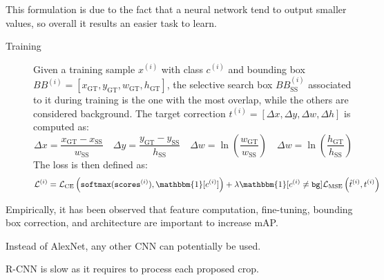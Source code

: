 \begin{description}
\begin{description}
                \begin{remark}
                    This formulation is due to the fact that a neural network tend to output smaller values, so overall it results an easier task to learn.
                \end{remark}

                \begin{description}
                    \item[Training] 
                    Given a training sample $x^{(i)}$ with class $c^{(i)}$ and bounding box $BB^{(i)} = [x_\text{GT}, y_\text{GT}, w_\text{GT}, h_\text{GT}]$, the selective search box $BB_\text{SS}^{(i)}$ associated to it during training is the one with the most overlap, while the others are considered background. The target correction $t^{(i)} = [\Delta x, \Delta y, \Delta w, \Delta h]$ is computed as:
                    \[ 
                        \Delta x = \frac{x_\text{GT} - x_\text{SS}}{w_\text{SS}}
                        \quad
                        \Delta y = \frac{y_\text{GT} - y_\text{SS}}{h_\text{SS}}
                        \quad
                        \Delta w = \ln\left(\frac{w_\text{GT}}{w_\text{SS}} \right)
                        \quad
                        \Delta w = \ln\left( \frac{h_\text{GT}}{h_\text{SS}} \right)
                    \]
                    The loss is then defined as:
                    \[ \mathcal{L}^{(i)} = \mathcal{L}_\text{CE}\left( \texttt{softmax}(\texttt{scores}^{(i)}), \mathbbm{1}[c^{(i)}] \right) + \lambda \mathbbm{1}[c^{(i)} \neq \texttt{bg}] \mathcal{L}_\text{MSE}\left(\hat{t}^{(i)}, t^{(i)} \right) \]

                \end{description}
        \end{description}

        \begin{remark}
            Empirically, it has been observed that feature computation, fine-tuning, bounding box correction, and architecture are important to increase mAP.
        \end{remark}

        \begin{remark}
            Instead of AlexNet, any other CNN can potentially be used.
        \end{remark}

        \begin{remark}
            R-CNN is slow as it requires to process each proposed crop.
        \end{remark}


\end{description}
